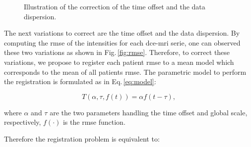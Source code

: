 \begin{figure}
  \centering
  \hspace*{\fill}
   \hfill
  \hspace*{\fill}
  \caption{Illustration of the correction of the time offset and the data dispersion.}
  \label{fig:curveal}
\end{figure}

The next variations to correct are the time offset and the data dispersion.
By computing the \ac{rmse} of the intensities for each \ac{dce}-\ac{mri} serie, one can observed these two variations as shown in Fig.\,\ref{fig:rmse}.
Therefore, to correct these variations, we propose to register each patient \ac{rmse} to a mean model which corresponds to the mean of all patients \ac{rmse}.
The parametric model to perform the registration is formulated as in Eq.\,\eqref{eq:model}:

\begin{equation}
  T(\alpha, \tau, f(t)) = \alpha f(t - \tau) ,
  \label{eq:model}
\end{equation}

\noindent where $\alpha$ and $\tau$ are the two parameters handling the time offset and global scale, respectively, $f(\cdot)$ is the \ac{rmse} function.

Therefore the registration problem is equivalent to:

